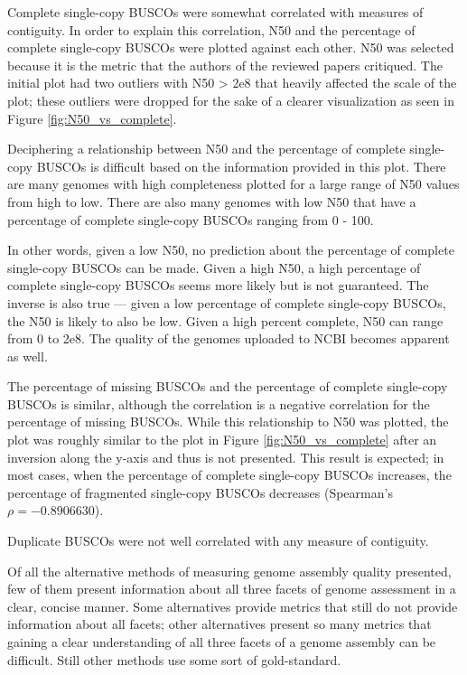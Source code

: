 \documentclass[twocolumn, dvipsnames]{bmcart}%
\begin{document}
Complete single-copy BUSCOs were somewhat correlated with measures of contiguity. In order to explain this correlation, N50 and the percentage of complete single-copy BUSCOs were plotted against each other. N50 was selected because it is the metric that the authors of the reviewed papers critiqued. The initial plot had two outliers with N50 > 2e8 that heavily affected the scale of the plot; these outliers were dropped for the sake of a clearer visualization as seen in Figure \ref{fig:N50_vs_complete}.


Deciphering a relationship between N50 and the percentage of complete single-copy BUSCOs is difficult based on the information provided in this plot. There are many genomes with high completeness plotted for a large range of N50 values from high to low. There are also many genomes with low N50 that have a percentage of complete single-copy BUSCOs ranging from 0 - 100.

In other words, given a low N50, no prediction about the percentage of complete single-copy BUSCOs can be made. Given a high N50, a high percentage of complete single-copy BUSCOs seems more likely but is not guaranteed. The inverse is also true --- given a low percentage of complete single-copy BUSCOs, the N50 is likely to also be low. Given a high percent complete, N50 can range from 0 to 2e8. The quality of the genomes uploaded to NCBI becomes apparent as well.

The percentage of missing BUSCOs and the percentage of complete single-copy BUSCOs is similar, although the correlation is a negative correlation for the percentage of missing BUSCOs. While this relationship to N50 was plotted, the plot was roughly similar to the plot in Figure \ref{fig:N50_vs_complete} after an inversion along the y-axis and thus is not presented. This result is expected; in most cases, when the percentage of complete single-copy BUSCOs increases, the percentage of fragmented single-copy BUSCOs decreases (Spearman's $\rho = -0.8906630$).

Duplicate BUSCOs were not well correlated with any measure of contiguity.

Of all the alternative methods of measuring genome assembly quality presented, few of them present information about all three facets of genome assessment in a clear, concise manner. Some alternatives provide metrics that still do not provide information about all facets; other alternatives present so many metrics that gaining a clear understanding of all three facets of a genome assembly can be difficult. Still other methods use some sort of gold-standard.
\end{document}
